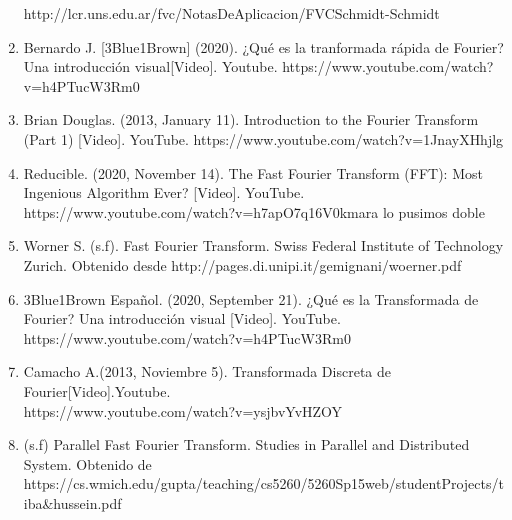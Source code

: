 \documentclass{article}
\begin{document}
\begin{enumerate}
    http://lcr.uns.edu.ar/fvc/NotasDeAplicacion/FVCSchmidt-Schmidt%
    \item  Bernardo J. [3Blue1Brown] (2020). ¿Qué es la tranformada rápida de Fourier? Una introducción visual[Video]. Youtube. https://www.youtube.com/watch?v=h4PTucW3Rm0
    \item Brian Douglas. (2013, January 11). Introduction to the Fourier Transform (Part 1) [Video]. YouTube. https://www.youtube.com/watch?v=1JnayXHhjlg
    \item Reducible. (2020, November 14). The Fast Fourier Transform (FFT): Most Ingenious Algorithm Ever? [Video]. YouTube. https://www.youtube.com/watch?v=h7apO7q16V0kmara lo pusimos doble
    \item Worner S. (s.f). Fast Fourier Transform. Swiss Federal Institute of Technology Zurich. Obtenido desde http://pages.di.unipi.it/gemignani/woerner.pdf
    \item 3Blue1Brown Español. (2020, September 21). ¿Qué es la Transformada de Fourier? Una introducción visual [Video]. YouTube. https://www.youtube.com/watch?v=h4PTucW3Rm0
    \item Camacho A.(2013, Noviembre 5). Transformada Discreta de Fourier[Video].Youtube. \\ https://www.youtube.com/watch?v=ysjbvYvHZOY
    \item (s.f) Parallel Fast Fourier Transform. Studies in Parallel and Distributed System. Obtenido de \\
    
https://cs.wmich.edu/gupta/teaching/cs5260/5260Sp15web/studentProjects/tiba\&hussein.pdf
\end{enumerate}
\end{document}
